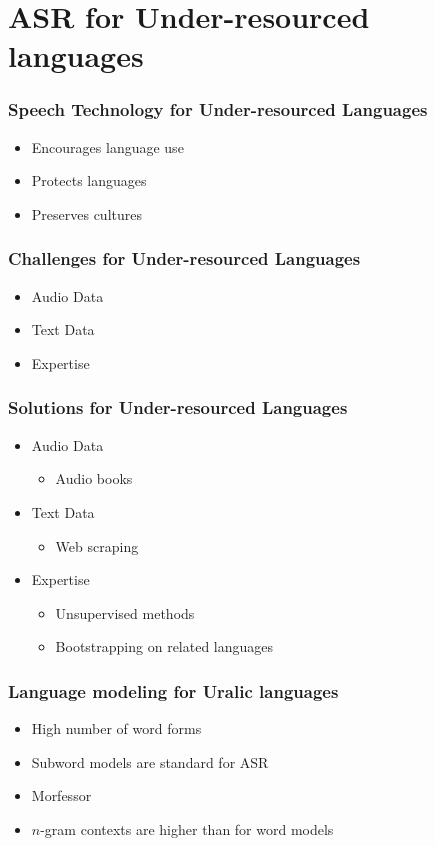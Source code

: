 \section[Under-resourced]{ASR for Under-resourced languages}
\begin{frame}
\frametitle{Speech Technology for Under-resourced Languages}
\begin{itemize}
\item Encourages language use
\item Protects languages
\item Preserves cultures
\end{itemize}
\end{frame}

\begin{frame}
\frametitle{Challenges for Under-resourced Languages}
\begin{itemize}
\item Audio Data
\item Text Data
\item Expertise
\end{itemize}
\end{frame}
%

\begin{frame}
\frametitle{Solutions for Under-resourced Languages}
\begin{itemize}
\item Audio Data
\begin{itemize}
\item Audio books
\end{itemize}
\item Text Data
\begin{itemize}
\item Web scraping
\end{itemize}
\item Expertise
\begin{itemize}
\item Unsupervised methods
\item Bootstrapping on related languages
\end{itemize}
\end{itemize}
\end{frame}


\begin{frame}
\frametitle{Language modeling for Uralic languages}
\begin{itemize}
\item High number of word forms
\item Subword models are standard for ASR
\item Morfessor
\item $n$-gram contexts are higher than for word models
\end{itemize}
\end{frame}


